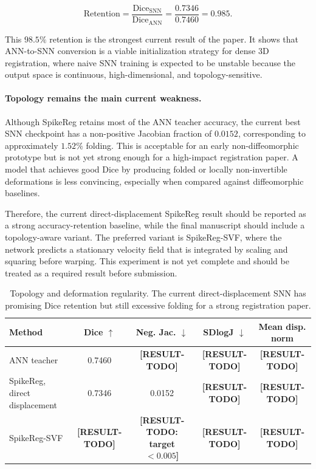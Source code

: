 \begin{equation}
\mathrm{Retention}
=
\frac{\mathrm{Dice}_{\mathrm{SNN}}}{\mathrm{Dice}_{\mathrm{ANN}}}
=
\frac{0.7346}{0.7460}
=
0.985.
\end{equation}

This $98.5\%$ retention is the strongest current result of the paper. It shows that ANN-to-SNN conversion is a viable initialization strategy for dense 3D registration, where naive SNN training is expected to be unstable because the output space is continuous, high-dimensional, and topology-sensitive.


\paragraph{Topology remains the main current weakness.}
Although SpikeReg retains most of the ANN teacher accuracy, the current best SNN checkpoint has a non-positive Jacobian fraction of $0.0152$, corresponding to approximately $1.52\%$ folding. This is acceptable for an early non-diffeomorphic prototype but is not yet strong enough for a high-impact registration paper. A model that achieves good Dice by producing folded or locally non-invertible deformations is less convincing, especially when compared against diffeomorphic baselines.

Therefore, the current direct-displacement SpikeReg result should be reported as a strong accuracy-retention baseline, while the final manuscript should include a topology-aware variant. The preferred variant is SpikeReg-SVF, where the network predicts a stationary velocity field that is integrated by scaling and squaring before warping. This experiment is not yet complete and should be treated as a required result before submission.

\begin{table}[t]
\centering
\caption{
Topology and deformation regularity. 
The current direct-displacement SNN has promising Dice retention but still excessive folding for a strong registration paper.
}
\label{tab:topology}
\begin{tabular}{lcccc}
\hline
Method & Dice $\uparrow$ & Neg. Jac. $\downarrow$ & SDlogJ $\downarrow$ & Mean disp. norm \\
\hline
ANN teacher & 0.7460 & \textbf{[RESULT-TODO]} & \textbf{[RESULT-TODO]} & \textbf{[RESULT-TODO]} \\
SpikeReg, direct displacement & 0.7346 & 0.0152 & \textbf{[RESULT-TODO]} & \textbf{[RESULT-TODO]} \\
SpikeReg-SVF & \textbf{[RESULT-TODO]} & \textbf{[RESULT-TODO: target $<0.005$]} & \textbf{[RESULT-TODO]} & \textbf{[RESULT-TODO]} \\
\hline
\end{tabular}
\end{table}

